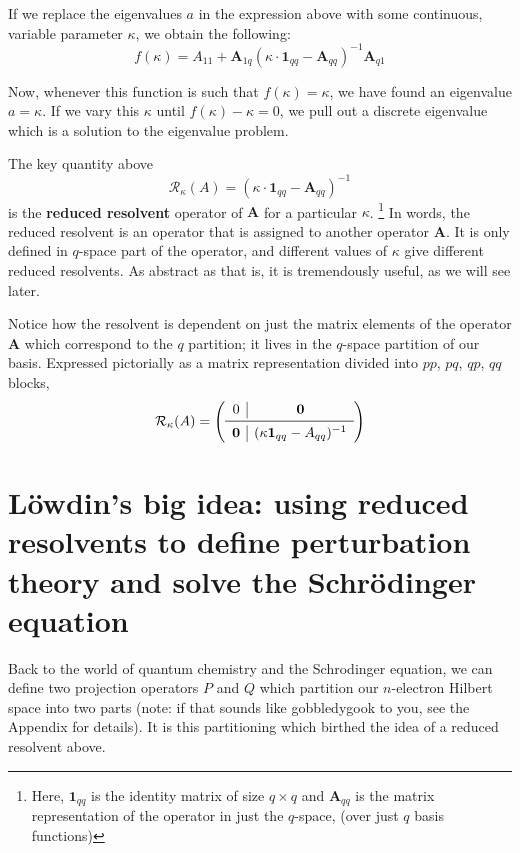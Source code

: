 \documentclass{article}
\begin{document}
If we replace the eigenvalues $a$ in the expression above with some continuous, variable parameter $\kappa$, we obtain the following: 
\[f(\kappa) =  A_{11} + \mathbf{A}_{1q}( \kappa \cdot \mathbf{1}_{qq} - \mathbf{A}_{qq})^{-1} \mathbf{A}_{q1} \]

Now, whenever this function is such that $f(\kappa) = \kappa $, we have found an eigenvalue $a = \kappa$.
If we vary this $\kappa$ until $f(\kappa) - \kappa = 0$, we pull out a discrete eigenvalue which is a solution to the eigenvalue problem. 

The key quantity above 
\[\mathcal{R}_{\kappa}(A) = ( \kappa \cdot \mathbf{1}_{qq} - \mathbf{A}_{qq})^{-1}\]
is the \textbf{reduced resolvent} operator of $\mathbf{A}$ for a particular $\kappa$.
\footnote{Here, $\mathbf{1}_{qq}$ is the identity matrix of size $q \times q$ and $\mathbf{A}_{qq}$ is 
 the matrix representation of the operator in just the $q$-space, (over just $q$ basis functions)}
In words, the reduced resolvent is an operator that is assigned to another operator $\mathbf{A}$.
It is only defined in $q$-space part of the operator, and different values of $\kappa$ give different reduced resolvents.
As abstract as that is, it is tremendously useful, as we will see later.

Notice how the resolvent is dependent on just the matrix elements of the operator $\mathbf{A}$
which correspond to the $q$ partition; it lives in the $q$-space partition of our basis.
Expressed pictorially as a matrix representation divided into $pp$, $pq$, $qp$, $qq$ blocks,
\[\mathcal{R}_{\kappa}(A) =
\left( \begin{array}{c|c}
   0 & \mathbf{0} \\
   \midrule
   \mathbf{0} & (\kappa \mathbf{1}_{qq} - A_{qq})^{-1} \\
\end{array}\right)
  \]

\section{L{\"o}wdin's big idea: using reduced resolvents to define perturbation theory and solve the Schr{\"o}dinger equation}
Back to the world of quantum chemistry and the Schrodinger equation, 
we can define two projection operators $P$ and $Q$ which partition our $n$-electron Hilbert space into two parts (note: if that sounds like gobbledygook to you, see the Appendix for details).
It is this partitioning which birthed the idea of a reduced resolvent above.
\end{document}
